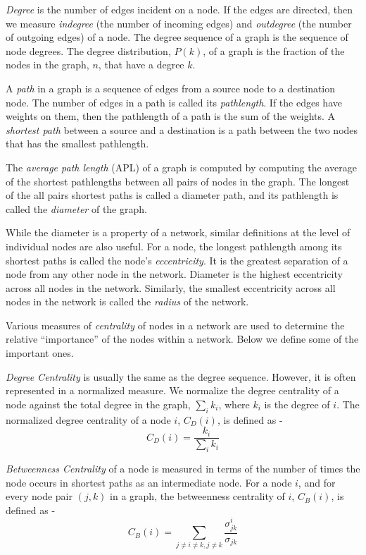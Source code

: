 \documentclass[10pt]{article}
\begin{document}
\textit{Degree} is the number of edges incident on a node. If the edges are directed, then we measure \textit{indegree} (the number of incoming edges) and \textit{outdegree} (the number of outgoing edges) of a node. The degree sequence of a graph is the sequence of node degrees. The degree distribution, $P(k)$, of a graph is the fraction of the nodes in the graph, $n$, that have a degree $k$.

A \textit{path} in a graph is a sequence of edges from a source node to a destination node. The number of edges in a path is called its \textit{pathlength}. If the edges have weights on them, then the pathlength of a path is the  sum of the weights. A \textit{shortest path} between a source and a destination is a path between the two nodes that has the smallest pathlength.

The \textit{average path length} (APL) of a graph is computed by computing the average of the shortest pathlengths between all pairs of nodes in the graph. The longest of the all pairs shortest paths is called a diameter path, and its pathlength is called the \textit{diameter} of the graph.

While the diameter is a property of a network, similar definitions at the level of individual nodes are also useful. For a node, the longest pathlength among its shortest paths is called the node's \textit{eccentricity}. It is the greatest separation of a node from any other node in the network. Diameter is the highest eccentricity across all nodes in the network. Similarly, the smallest eccentricity across all nodes in the network is called the \textit{radius} of the network.

Various measures of \textit{centrality} of nodes in a network are used to determine the relative ``importance'' of the nodes within a network. Below we define some of the important ones.

\textit{Degree Centrality} is usually the same as the degree sequence. However, it is often represented in a normalized measure. We normalize the degree centrality of a node against the total degree in the graph, $\sum_{i}k_{i}$, where $k_{i}$ is the degree of $i$. The normalized degree centrality of a node $i$, $C_{D}(i)$, is defined as -
\[C_{D}(i) = \frac{k_{i}}{\sum_{i}k_{i}}\]

\textit{Betweenness Centrality} of a node is measured in terms of the number of times the node occurs in shortest paths as an intermediate node. For a node $i$, and for every node pair $(j, k)$ in a graph, the betweenness centrality of $i$, $C_{B}(i)$, is defined as -
\[C_{B}(i) = \sum_{j \ne i \ne k, j \ne k}\frac{\sigma_{jk}^{i}}{\sigma_{jk}}\]
\end{document}
